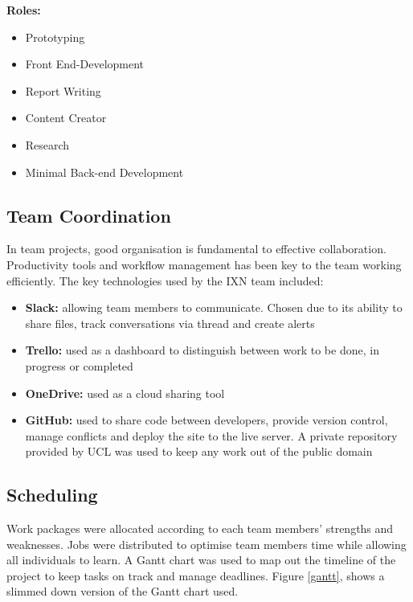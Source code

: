 \textbf{Roles:}

\begin{itemize}
\tightlist
\item
  Prototyping
\item
  Front End-Development
\item
  Report Writing
\item
  Content Creator
\item
  Research
\item
  Minimal Back-end Development
\end{itemize}

\hypertarget{team-coordination}{%
\subsection{Team Coordination}\label{team-coordination}}

In team projects, good organisation is fundamental to effective
collaboration. Productivity tools and workflow management has been key
to the team working efficiently. The key technologies used by the IXN
team included:

\begin{itemize}
\tightlist
\item
  \textbf{Slack:} allowing team members to communicate. Chosen due to
  its ability to share files, track conversations via thread and create
  alerts
\item
  \textbf{Trello:} used as a dashboard to distinguish between work to be
  done, in progress or completed
\item
  \textbf{OneDrive:} used as a cloud sharing tool
\item
  \textbf{GitHub:} used to share code between developers, provide
  version control, manage conflicts and deploy the site to the live
  server. A private repository provided by UCL was used to keep any work
  out of the public domain
\end{itemize}

\hypertarget{scheduling}{%
\subsection{Scheduling}\label{scheduling}}

Work packages were allocated according to each team members' strengths
and weaknesses. Jobs were distributed to optimise team members time
while allowing all individuals to learn. A Gantt chart was used to map
out the timeline of the project to keep tasks on track and manage
deadlines. Figure \ref{gantt}, shows a slimmed down version of the Gantt
chart used.


